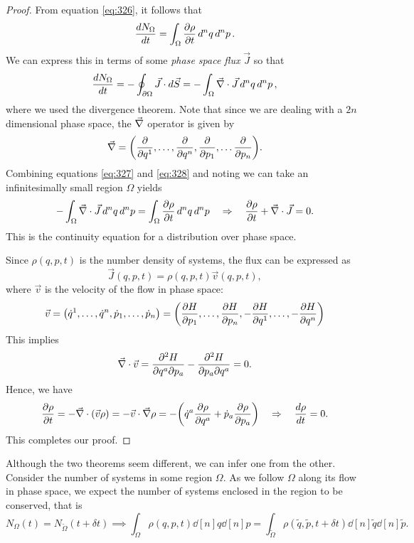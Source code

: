 \documentclass{article}
\begin{document}
\begin{proof}
	From equation \eqref{eq:326}, it follows that
	\begin{equation} \label{eq:327}
		\dv{N_{\Omega}}{t} = \int_{\Omega} \pdv{\rho}{t} \dd[n]{q} \dd[n]{p}.
	\end{equation}
	We can express this in terms of some \textit{phase space flux} $ \vec{J} $ so that
	\begin{equation} \label{eq:328}
		\dv{N_{\Omega}}{t} = -\oint_{\partial \Omega} \vec{J} \cdot \dd{\vec{S}} = - \int_{\Omega} \vec{\nabla} \cdot \vec{J} \dd[n]{q} \dd[n]{p},
	\end{equation}
	where we used the divergence theorem. Note that since we are dealing with a $ 2n $ dimensional phase space, the $ \grad $ operator is given by
	\[
		\vec{\nabla} = \qty(\pdv{q^{1}}, \dots, \pdv{q^{n}}, \pdv{p_{1}}, \dots \pdv{p_{n}}).
	\]
	Combining equations \eqref{eq:327} and \eqref{eq:328} and noting we can take an infinitesimally small region $ \Omega $ yields
	\[
		- \int_{\Omega} \vec{\nabla} \cdot \vec{J} \dd[n]{q} \dd[n]{p} = \int_{\Omega} \pdv{\rho}{t} \dd[n]{q} \dd[n]{p} \quad \Rightarrow \quad \pdv{\rho}{t} + \vec{\nabla} \cdot \vec{J} = 0.
	\]
	This is the continuity equation for a distribution over phase space.
	\par
	Since $ \rho(q,p,t) $ is the number density of systems, the flux can be expressed as
	\[
		\vec{J}(q,p,t) = \rho(q,p,t) \vec{v}(q,p,t),
	\]
	where $ \vec{v} $ is the velocity of the flow in phase space:
	\[
		\vec{v} = \qty(\dot{q}^{1}, \dots , \dot{q}^{n}, \dot{p}_{1}, \dots, \dot{p}_{n}) = \qty(\pdv{H}{p_{1}}, \dots, \pdv{H}{p_{n}}, -\pdv{H}{q^{1}}, \dots, -\pdv{H}{q^{n}})
	\]
	This implies
	\[
		\vec{\nabla} \cdot \vec{v} = \pdv{H}{q^a}{p_{a}} - \pdv{H}{p_{a}}{q^{a}}  = 0.
	\]
	Hence, we have
	\begin{equation}
		\pdv{\rho}{t}  = - \vec{\nabla} \cdot (\vec{v}\rho) = - \vec{v} \cdot \vec{\nabla} \rho = -\qty( \dot{q}^a \pdv{\rho}{q^a} + \dot{p}_{a} \pdv{\rho}{p_{a}}) \quad \Rightarrow \quad \dv{\rho}{t} = 0.
	\end{equation}
	This completes our proof.
\end{proof}
Although the two theorems seem different, we can infer one from the other. Consider the number of systems in some region $ \Omega $. As we follow $ \Omega $ along its flow in phase space, we expect the number of systems enclosed in the region to be conserved, that is
\begin{equation}
	N_{\Omega}(t) = N_{\tilde{\Omega}}(t+\delta t) \implies \int_{\Omega} \rho(q,p,t) \dd[n]{q}\dd[n]{p} = \int_{\tilde{\Omega}} \rho(\tilde{q}, \tilde{p}, t+\delta t) \dd[n]{\tilde{q}} \dd[n]{\tilde{p}}.
\end{equation}
\end{document}
